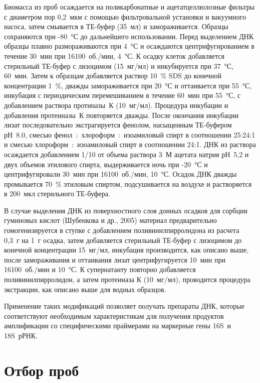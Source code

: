 \documentclass[a4paper,12pt,openany,final]{extreport}
\begin{document}
Биомасса из проб осаждается на поликарбонатные и ацетатцеллюлозные фильтры с диаметром пор 0,2~мкм с помощью фильтровальной установки и вакуумного насоса, затем смывается в ТЕ-буфер (35~мл) и замораживается. Образцы сохраняются при -80~°С до дальнейшего использовании. Перед выделением ДНК образцы плавно размораживаются при 4~°С и осаждаются центрифугированием в течение 30~мин при 16100~об./мин, 4~°С. К осадку клеток добавляется стерильный ТЕ-буфер с лизоцимом (15~мг/мл) и инкубируется при 37~°С, 60~мин. Затем к образцам добавляется раствор 10~\% SDS до конечной концентрации 1~\%, дважды замораживается при 20~°С и оттаивается при 55~°С, инкубация с периодическим перемешиванием в течение 60~мин при 55~°С, с добавлением раствора протиназы~К (10~мг/мл). Процедура инкубации и добавления протеиназы~К повторяется дважды. После окончания инкубации лизат последовательно экстрагируется фенолом, насыщенным ТЕ-буфером рН~8.0, смесью фенол~:~хлороформ~:~изоамиловый спирт в соотношении 25:24:1 и смесью хлороформ~:~изоамиловый спирт в соотношении 24:1. ДНК из раствора осаждается добавлением 1/10 от объема раствора 3~М ацетата натрия рН~5,2 и двух объемов этилового спирта, выдерживается ночь при -20~°С и центрифугировали 30~мин при 16100~об./мин, 10~°С. Осадок ДНК дважды промывается 70~\% этиловым спиртом, подсушивается на воздухе и растворяется в 200~мкл стерильного ТЕ-буфера.

В случае выделения ДНК из поверхностного слоя донных осадков для сорбции гуминовых кислот (Шубенкова и др., 2005) материал предварительно гомогенизируется в ступке с добавлением поливинилпирролидона из расчета 0,3~г на 1~г осадка, затем добавляется стерильный ТЕ-буфер с лизоцимом до конечной концентрации 15~мг/мл, инкубация производится, как описано выше, после замораживания и оттаивания лизат центрифугируется 10~мин при 16100~об./мин и 10~°С. К супернатанту повторно добавляется поливинилпирролидон, а затем протеиназа К (10~мг/мл), проводится процедура экстракции, как описано выше для водных образцов.

Применение таких модификаций позволяет получать препараты ДНК, которые соответствуют необходимым характеристикам для получения продуктов амплификации со специфическими праймерами на маркерные гены 16S~и 18S~рРНК.

\section{Отбор проб}
\end{document}
